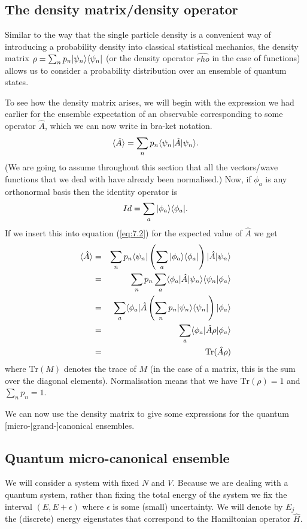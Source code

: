 \subsection*{The density matrix/density operator}
Similar to the way that the single particle density is a convenient way of introducing a probability density into classical statistical mechanics, the density matrix $\rho = \sum_n p_n| \psi_n \rangle\langle \psi_n |$ (or the density operator $\hat{rho}$ in the case of functions) allows us to consider a probability distribution over an ensemble of quantum states.

To see how the density matrix arises, we will begin with the expression we had earlier for the ensemble expectation of an observable corresponding to some operator $\hat{A}$, which we can now write in bra-ket notation.
\begin{equation}
	\langle\hat{A}\rangle = \sum_n p_n\langle \psi_n |\hat{A}| \psi_n \rangle.
	\label{eq:7.2}
\end{equation}
(We are going to assume throughout this section that all the vectors/wave functions that we deal with have already been normalised.) Now, if $\phi_a$ is any orthonormal basis then the identity operator is
$$
	Id = \sum_a| \phi_a \rangle\langle \phi_a |.
$$
If we insert this into equation (\ref{eq:7.2}) for the expected value of $\hat{A}$ we get
\begin{eqnarray*}
	\langle\hat{A}\rangle &=& \sum_n p_n\langle \psi_n | \left(\sum_a| \phi_a \rangle\langle \phi_a |\right) |\hat{A}| \psi_n \rangle\\
	&=& \sum_n p_n\sum_a\langle \phi_a |\hat{A}| \psi_n \rangle\langle \psi_n | \phi_a\rangle\\
	&=& \sum_a \langle \phi_a |\hat{A} \left(\sum_n p_n | \psi_n \rangle\langle \psi_n |\right)| \phi_a \rangle\\
	&=& \sum_a \langle \phi_a |\hat{A}\rho| \phi_a \rangle\\
	&=& \text{Tr}(\hat{A}\rho)
\end{eqnarray*}
where $\text{Tr}(M)$ denotes the trace of $M$ (in the case of a matrix, this is the sum over the diagonal elements).
Normalisation means that we have $\text{Tr}(\rho)=1$ and $\sum_n p_n=1$.

We can now use the density matrix to give some expressions for the quantum [micro-$|$grand-]canonical ensembles.

\subsection{Quantum micro-canonical ensemble}
We will consider a system with fixed $N$ and $V$. Because we are dealing with a quantum system, rather than fixing the total energy of the system we fix the interval $(E,E+\epsilon)$ where $\epsilon$ is some (small) uncertainty. We will denote by $E_j$ the (discrete) energy eigenstates that correspond to the Hamiltonian operator $\hat{H}$.

